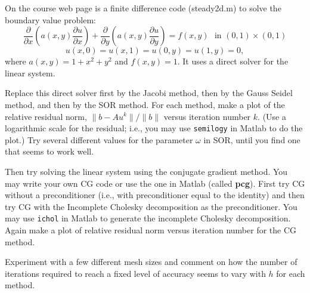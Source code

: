 \documentclass[10pt]{article}
\begin{document}
\maketitle


\begin{problem}[Problem 1]
On the course web page is a finite difference code (steady2d.m) to solve the boundary value problem:
\[
\frac{\partial}{\partial x} \left( a(x,y) \frac{\partial u}{\partial x}
\right) +
\frac{\partial}{\partial y} \left( a(x,y) \frac{\partial u}{\partial y}
\right) = f(x,y)~~~\mbox{in } (0,1) \times (0,1)
\]
\[
u(x,0) = u(x,1) = u(0,y) = u(1,y) = 0 ,
\]
where \( a(x,y) = 1 + x^2 + y^2 \) and \( f(x,y) = 1 \).
It uses a direct solver for the linear system.

Replace this direct solver first by the Jacobi method, then by the Gauss Seidel method, and then by the SOR method. For each method, make a plot of the relative residual norm, \( \| b - A u^k \| / \| b \| \) versus iteration number \( k \). (Use a logarithmic scale for the residual; i.e., you may use \verb+semilogy+
in Matlab to do the plot.) Try several different values for the parameter \( \omega \) in SOR, until you find one that seems to work well.

Then try solving the linear system using the conjugate gradient method.  You may write your own CG code or use the one in Matlab (called {\bf pcg}).  First try CG without a preconditioner (i.e., with preconditioner equal to the identity) and then try CG with the Incomplete Cholesky decomposition as the preconditioner. You may use \verb+ichol+ in Matlab to generate the incomplete Cholesky decomposition.  Again make a plot of relative residual norm versus iteration number for the CG method.

Experiment with a few different mesh sizes and comment on how the number of iterations required to reach a fixed level of accuracy seems to vary with \( h \) for each method.
\end{problem}
\end{document}
